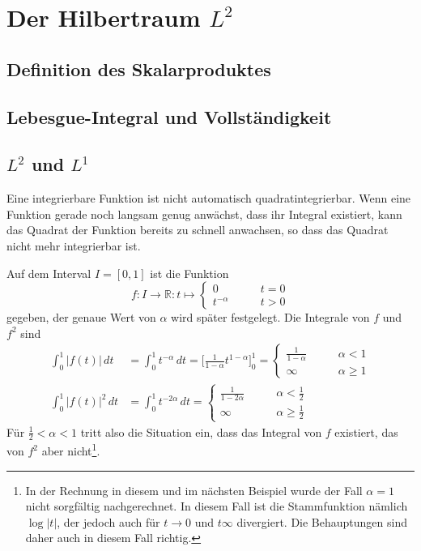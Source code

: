 %
%
%
\section{Der Hilbertraum $L^2$
\label{section:l2}}

\subsection{Definition des Skalarproduktes}

\subsection{Lebesgue-Integral und Vollständigkeit}

\subsection{$L^2$ und $L^1$}
Eine integrierbare Funktion ist nicht automatisch
quadratintegrierbar.
Wenn eine Funktion gerade noch langsam genug anwächst, dass ihr
Integral existiert, kann das Quadrat der Funktion bereits zu schnell
anwachsen, so dass das Quadrat nicht mehr integrierbar ist.

\begin{beispiel}
Auf dem Interval $I=[0,1]$ ist die Funktion
\[
f\colon I\to \mathbb R: t\mapsto \begin{cases} 0&\qquad t=0\\
t^{-\alpha}&\qquad t > 0
\end{cases}
\]
gegeben, der genaue Wert von $\alpha$ wird später festgelegt.
Die Integrale von $f$ und $f^2$ sind
\begin{align*}
\int_0^1 |f(t)|\,dt
&=
\int_0^1 t^{-\alpha}\,dt
=
\biggl[\frac{1}{1-\alpha}t^{1-\alpha}\biggr]_0^1
=
\begin{cases}
\frac{1}{1-\alpha}&\qquad \alpha < 1\\
\infty&\qquad \alpha \ge 1
\end{cases}
\\
\int_0^1|f(t)|^2\,dt
&=
\int_0^1 t^{-2\alpha}\,dt
=
\begin{cases}
\frac{1}{1-2\alpha}&\qquad \alpha < \frac12\\
\infty&\qquad \alpha \ge \frac12
\end{cases}
\end{align*}
Für $\frac12<\alpha<1$ tritt also die Situation ein, dass das Integral
von $f$ existiert, das von $f^2$ aber nicht\footnote{In der Rechnung in
diesem und im nächsten Beispiel wurde der Fall $\alpha=1$ nicht sorgfältig
nachgerechnet.
In diesem Fall ist die Stammfunktion nämlich $\log|t|$, der jedoch
auch für $t\to 0$ und $t\infty$ divergiert.
Die Behauptungen sind daher auch in diesem Fall richtig.}.
\end{beispiel}

